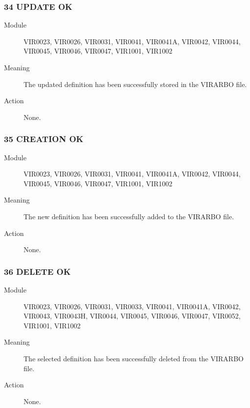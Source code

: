 \documentclass[letterpaper,10pt,english]{sphinxmanual}
\begin{document}
\subsubsection{34 UPDATE OK}
\label{\detokenize{messages:update-ok}}\begin{description}
\item[{Module}] \leavevmode
VIR0023, VIR0026, VIR0031, VIR0041, VIR0041A, VIR0042, VIR0044, VIR0045, VIR0046, VIR0047, VIR1001, VIR1002

\item[{Meaning}] \leavevmode
The updated definition has been successfully stored in the VIRARBO file.

\item[{Action}] \leavevmode
None.

\end{description}


\subsubsection{35 CREATION OK}
\label{\detokenize{messages:creation-ok}}\begin{description}
\item[{Module}] \leavevmode
VIR0023, VIR0026, VIR0031, VIR0041, VIR0041A, VIR0042, VIR0044, VIR0045, VIR0046, VIR0047, VIR1001, VIR1002

\item[{Meaning}] \leavevmode
The new definition has been successfully added to the VIRARBO file.

\item[{Action}] \leavevmode
None.

\end{description}


\subsubsection{36 DELETE OK}
\label{\detokenize{messages:delete-ok}}\begin{description}
\item[{Module}] \leavevmode
VIR0023, VIR0026, VIR0031, VIR0033, VIR0041, VIR0041A, VIR0042, VIR0043, VIR0043H, VIR0044, VIR0045, VIR0046, VIR0047, VIR0052, VIR1001, VIR1002

\item[{Meaning}] \leavevmode
The selected definition has been successfully deleted from the VIRARBO file.

\item[{Action}] \leavevmode
None.

\end{description}
\end{document}

